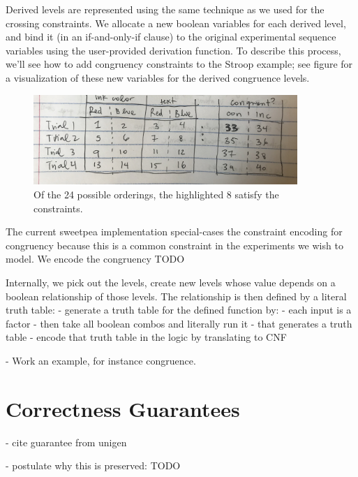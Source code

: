 Derived levels are represented using the same technique as we used for the crossing constraints. We allocate a new boolean variables for each derived level, and bind it (in an if-and-only-if clause) to the original experimental sequence variables using the user-provided derivation function. To describe this process, we'll see how to add congruency constraints to the Stroop example; see figure  for a visualization of these new variables for the derived congruence levels.

\begin{figure}[t]
    \centerline{\includegraphics[origin=c,width=10cm]{fig_congruence_vars_stroop}}
    \caption{Of the 24 possible orderings, the highlighted 8 satisfy the constraints.}%
    \label{fig:congruence_vars_stroop}%
\end{figure}

The current sweetpea implementation special-cases the constraint encoding for congruency because this is a common constraint in the experiments we wish to model. We encode the congruency TODO


Internally, we pick out the levels, create new levels whose value depends on a boolean relationship of those levels. The relationship is then defined by a literal truth table:
- generate a truth table for the defined function by:
- each input is a factor
- then take all boolean combos and literally run it
- that generates a truth table
- encode that truth table in the logic by translating to CNF

- Work an example, for instance congruence.


\section{Correctness Guarantees}

- cite guarantee from unigen

- postulate why this is preserved: TODO
